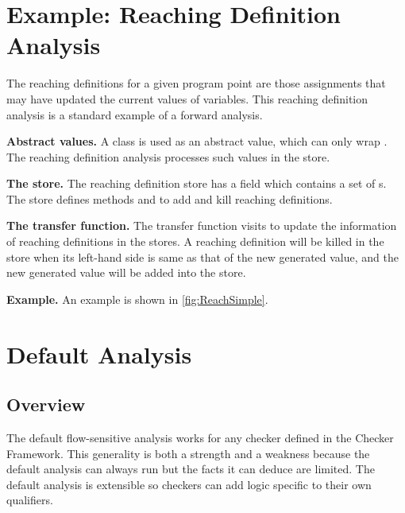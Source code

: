 
\section{Example: Reaching Definition Analysis}

The reaching definitions for a given program point are those assignments that
may have updated the current values of variables.
This reaching definition analysis is a standard example of a forward analysis.

\textbf{Abstract values.} A class  is used as an
abstract value, which can only wrap . The reaching definition analysis
processes such values in the store.

\textbf{The store.} The reaching definition store  has a field
 which contains a set of s. The store defines methods
 and  to add
and kill reaching definitions.

\textbf{The transfer function.} The transfer function visits  to
update the information of reaching definitions in the stores. A reaching definition will
be killed in the store when its left-hand side is same as that of the new generated value, and the new
generated value will be added into the store.

\textbf{Example.} An example is shown in \autoref{fig:ReachSimple}.



\section{Default Analysis}


\subsection{Overview}

The default flow-sensitive analysis 
works for any checker defined in the
Checker Framework.  This generality is both a strength and a weakness
because the default analysis can always run but the facts it can
deduce are limited.  The default analysis is extensible so checkers
can add logic specific to their own qualifiers.

